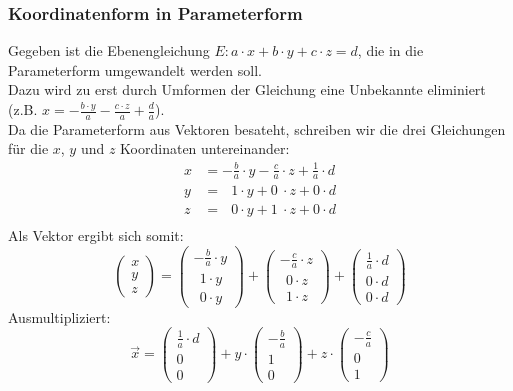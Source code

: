 \documentclass[a4paper,12pt]{article}
\begin{document}
\subsubsection{Koordinatenform in Parameterform}
Gegeben ist die Ebenengleichung $E : a \cdot x + b \cdot y + c \cdot z = d$, die in die Parameterform umgewandelt werden soll.\\
Dazu wird zu erst durch Umformen der Gleichung eine Unbekannte eliminiert (z.B. $x = -\frac{b \cdot y}{a} - \frac{c \cdot z}{a} + \frac{d}{a}$).\\
Da die Parameterform aus Vektoren besateht, schreiben wir die drei Gleichungen für die $x$, $y$ und $z$ Koordinaten untereinander:\\
\begin{equation*}
\begin{split}
x & = -\frac{b}{a} \cdot y - \frac{c}{a} \cdot z + \frac{1}{a} \cdot d\\
y & = \ \ \ 1 \cdot y + 0\ \cdot z + 0 \cdot d\\
z & = \ \ \ 0 \cdot y + 1\ \cdot z + 0 \cdot d\\
\end{split}
\end{equation*}
Als Vektor ergibt sich somit:
$$\begin{pmatrix}x\\y\\z\end{pmatrix} = \begin{pmatrix}-\frac{b}{a} \cdot y\\\ \ 1 \cdot y\\\ \ 0 \cdot y\end{pmatrix} + \begin{pmatrix}- \frac{c}{a}\cdot z\\\ \ 0 \cdot z\\\ \ 1 \cdot z\end{pmatrix} + \begin{pmatrix}\frac{1}{a} \cdot d\\0 \cdot d\\0 \cdot d\end{pmatrix}$$
Ausmultipliziert:
$$\vec{x} = \begin{pmatrix}\frac{1}{a} \cdot d\\0\\0\end{pmatrix} + y \cdot \begin{pmatrix}-\frac{b}{a}\\1\\0\end{pmatrix} + z \cdot \begin{pmatrix}- \frac{c}{a}\\0\\1\end{pmatrix}$$ 
\pagebreak
\end{document}

